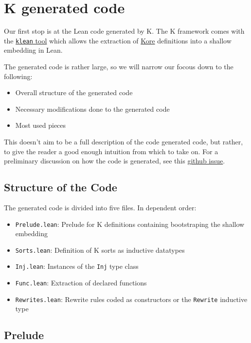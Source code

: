 \chapter{K generated code}

Our first stop is at the Lean code generated by K. The K framework comes with
the
\href{https://github.com/runtimeverification/k/tree/master/pyk/src/pyk/klean}{\texttt{klean}
tool} which allows the extraction of
\href{https://kframework.org/docs/user_manual/#k-process-overview}{Kore}
definitions into a shallow embedding in Lean.

The generated code is rather
large, so we will narrow our focous down to the following:

\begin{itemize}
\item Overall structure of the generated code
\item Necessary modifications done to the generated code
\item Most used pieces
\end{itemize}

This doesn't aim to be a full description of the code generated code, but
rather, to give the reader a good enough intuition from which to take on. For a
preliminary discussion on how the code is generated, see this
\href{https://github.com/runtimeverification/k/issues/4552}{github issue}.

\section{Structure of the Code}

The generated code is divided into five files. In dependent order:

\begin{itemize}
\item \texttt{Prelude.lean}: Prelude for K definitions containing bootstraping
  the shallow embedding
\item \texttt{Sorts.lean}: Definition of K sorts as inductive datatypes
\item \texttt{Inj.lean}: Instances of the \texttt{Inj} type class
\item \texttt{Func.lean}: Extraction of declared functions
\item \texttt{Rewrites.lean}: Rewrite rules coded as constructors or the
  \texttt{Rewrite} inductive type
\end{itemize}

\section{Prelude}

